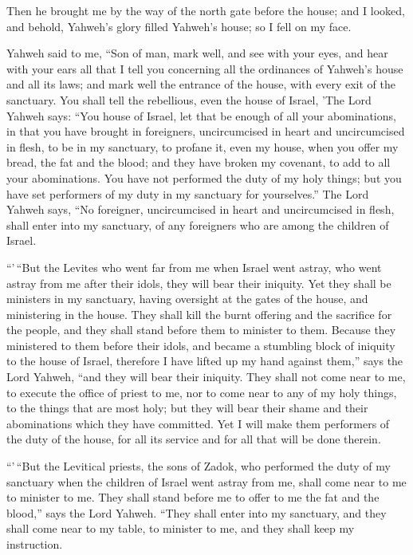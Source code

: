  Then he brought me by the way of the north gate before
the house; and I looked, and behold, Yahweh's glory filled Yahweh's
house; so I fell on my face.

 Yahweh said to me, ``Son of man, mark well, and see with
your eyes, and hear with your ears all that I tell you concerning all
the ordinances of Yahweh's house and all its laws; and mark well the
entrance of the house, with every exit of the sanctuary. 
You shall tell the rebellious, even the house of Israel, 'The Lord
Yahweh says: ``You house of Israel, let that be enough of all your
abominations,  in that you have brought in foreigners,
uncircumcised in heart and uncircumcised in flesh, to be in my
sanctuary, to profane it, even my house, when you offer my bread, the
fat and the blood; and they have broken my covenant, to add to all your
abominations.  You have not performed the duty of my holy
things; but you have set performers of my duty in my sanctuary for
yourselves.''  The Lord Yahweh says, ``No foreigner,
uncircumcised in heart and uncircumcised in flesh, shall enter into my
sanctuary, of any foreigners who are among the children of Israel.

 ``'\,``But the Levites who went far from me when Israel
went astray, who went astray from me after their idols, they will bear
their iniquity.  Yet they shall be ministers in my
sanctuary, having oversight at the gates of the house, and ministering
in the house. They shall kill the burnt offering and the sacrifice for
the people, and they shall stand before them to minister to them.
 Because they ministered to them before their idols, and
became a stumbling block of iniquity to the house of Israel, therefore I
have lifted up my hand against them,'' says the Lord Yahweh, ``and they
will bear their iniquity.  They shall not come near to
me, to execute the office of priest to me, nor to come near to any of my
holy things, to the things that are most holy; but they will bear their
shame and their abominations which they have committed. 
Yet I will make them performers of the duty of the house, for all its
service and for all that will be done therein.

 ``'\,``But the Levitical priests, the sons of Zadok, who
performed the duty of my sanctuary when the children of Israel went
astray from me, shall come near to me to minister to me. They shall
stand before me to offer to me the fat and the blood,'' says the Lord
Yahweh.  ``They shall enter into my sanctuary, and they
shall come near to my table, to minister to me, and they shall keep my
instruction.

